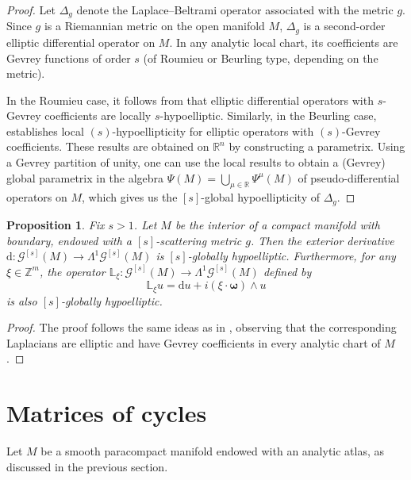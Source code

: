 \documentclass[11pt,reqno]{amsart}
\numberwithin{equation}{section}
\newtheorem{proposition}[theorem]{Proposition}
\begin{document}
	\begin{proof}
		Let $\Delta_g$ denote the Laplace--Beltrami operator associated with the metric $g$. Since $g$ is a Riemannian metric on the open manifold $M$, $\Delta_g$ is a second-order elliptic differential operator on $M$. In any analytic local chart, its coefficients are Gevrey functions of order $s$ (of Roumieu or Beurling type, depending on the metric).
		
		In the Roumieu case, it follows from \cite[Theorem~3.3.8]{Rod_Gevrey} that elliptic differential operators with $s$-Gevrey coefficients are locally $s$-hypoelliptic. Similarly, in the Beurling case, \cite[Proposition~2.12]{FGJ2005} establishes local $(s)$-hypoellipticity for elliptic operators with $(s)$-Gevrey coefficients. These results are obtained on $\mathbb{R}^n$ by constructing a parametrix. Using a Gevrey partition of unity, one can use the local results to obtain a (Gevrey) global parametrix in the algebra $\Psi(M)=\bigcup_{\mu\in\mathbb{R}}\Psi^\mu(M)$ of pseudo-differential operators on $M$, which gives us the ${[s]}$-global hypoellipticity of $\Delta_g$.
	\end{proof}
	
	
	\begin{proposition}\label{gev_gh}
		Fix $s>1$. Let $M$ be the interior of a compact manifold with boundary, endowed with a ${[s]}$-scattering metric $g$. Then the exterior derivative $\mathrm{d}:\mathscr{G}^{[s]}(M)\to\mathsf{\Lambda}^1\mathscr{G}^{[s]}(M)$ is ${[s]}$-globally hypoelliptic. Furthermore, for any $\xi \in \mathbb{Z}^m$, the operator $\mathbb{L}_\xi:\mathscr{G}^{[s]}(M)\to\mathsf{\Lambda}^1\mathscr{G}^{[s]}(M)$ defined by
		\[
		\mathbb{L}_\xi u = \mathrm{d}u + i(\xi\cdot\boldsymbol{\omega})\wedge u
		\]
		is also ${[s]}$-globally hypoelliptic.
	\end{proposition}
	\begin{proof}
		The proof follows the same ideas as in \cite[Corollary~2.4]{CKMT}, observing that the corresponding Laplacians are elliptic and have Gevrey coefficients in every analytic chart of $M$.
	\end{proof}
	

	
	\section{Matrices of cycles}\label{sec-Matrix-cycles}
	
	Let $M$ be a smooth paracompact manifold endowed with an analytic atlas, as discussed in the previous section.
	
\end{document}

